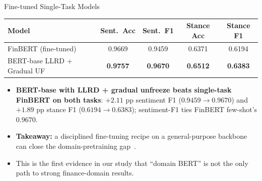 \documentclass[10pt, aspectratio=169]{beamer}
\begin{document}
\begin{frame}{Fine-tuned Single-Task Models}
    \centering
    {\small
    \begin{tabular}{lcccc}
        \toprule
        \textbf{Model} & \textbf{Sent.\ Acc} & \textbf{Sent.\ F1} & \textbf{Stance Acc} & \textbf{Stance F1} \\
        \midrule
        FinBERT (fine-tuned)                                            & 0.9669 & 0.9459 & 0.6371 & 0.6194 \\
        \rowcolor{UNSWYellow!30}
        BERT-base LLRD + Gradual UF~\cite{howard2018ulmfit,sun2019finetune} & \textbf{0.9757} & \textbf{0.9670} & \textbf{0.6512} & \textbf{0.6383} \\
        \bottomrule
    \end{tabular}
    }

    \vspace{0.6em}
    \begin{itemize}\setlength{\itemsep}{0.3em}
        \item \textbf{BERT-base with LLRD + gradual unfreeze beats single-task FinBERT on both tasks}: $+2.11$ pp sentiment F1 ($0.9459 \!\rightarrow\! 0.9670$) and $+1.89$ pp stance F1 ($0.6194 \!\rightarrow\! 0.6383$); sentiment-F1 ties FinBERT few-shot's $0.9670$.
        \item \textbf{Takeaway:} a disciplined fine-tuning recipe on a general-purpose backbone can close the domain-pretraining gap~\cite{sun2019finetune}.
        \item This is the first evidence in our study that \alert{``domain BERT'' is not the only path} to strong finance-domain results.
    \end{itemize}
\end{frame}
\end{document}
